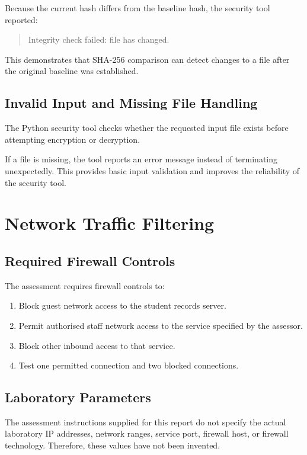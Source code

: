 \documentclass[12pt,a4paper]{article}
\begin{document}
Because the current hash differs from the baseline hash, the security tool reported:

\begin{quote}
Integrity check failed: file has changed.
\end{quote}

This demonstrates that SHA-256 comparison can detect changes to a file after the original baseline was established.

\subsection{Invalid Input and Missing File Handling}

The Python security tool checks whether the requested input file exists before attempting encryption or decryption.

If a file is missing, the tool reports an error message instead of terminating unexpectedly. This provides basic input validation and improves the reliability of the security tool.

\section{Network Traffic Filtering}

\subsection{Required Firewall Controls}

The assessment requires firewall controls to:

\begin{enumerate}
    \item Block guest network access to the student records server.
    \item Permit authorised staff network access to the service specified by the assessor.
    \item Block other inbound access to that service.
    \item Test one permitted connection and two blocked connections.
\end{enumerate}

\subsection{Laboratory Parameters}

The assessment instructions supplied for this report do not specify the actual laboratory IP addresses, network ranges, service port, firewall host, or firewall technology. Therefore, these values have not been invented.
\end{document}
